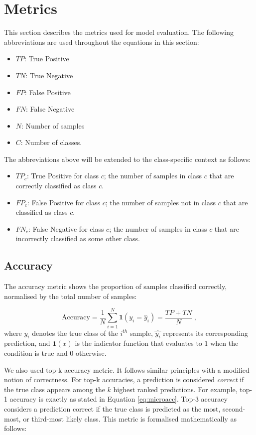\documentclass{l4proj}
\begin{document}
\section{Metrics} \label{sec:metrics}
This section describes the metrics used for model evaluation. The following abbreviations are used throughout the equations in this section:
\begin{itemize}
    \item $TP$: True Positive
    \item $TN$: True Negative
    \item $FP$: False Positive
    \item $FN$: False Negative
    \item $N$: Number of samples
    \item $C$: Number of classes.
\end{itemize}

The abbreviations above will be extended to the class-specific context as follows:
\begin{itemize}
    \item $TP_c$: True Positive for class $c$; the number of samples in class $c$ that are correctly classified as class $c$.
    \item $FP_c$: False Positive for class $c$; the number of samples not in class $c$ that are classified as class $c$.
    \item $FN_c$: False Negative for class $c$; the number of samples in class $c$ that are incorrectly classified as some other class.
\end{itemize}



\subsection{Accuracy} \label{sec:accuracy-metric}
The accuracy metric shows the proportion of samples classified correctly, normalised by the total number of samples:

\begin{equation} \label{eq:microacc}
    \text{Accuracy} = \frac{1}{N} \sum_{i=1}^{N}\boldsymbol{1}(y_i = \hat{y}_i) =  \frac{TP+TN}{N}\ ,
\end{equation}
where $y_i$ denotes the true class of the $i^{th}$ sample, $\hat{y_i}$ represents its corresponding prediction, and $\boldsymbol{1}(x)$ is the indicator function that evaluates to $1$ when the condition is true and $0$ otherwise.

We also used top-k accuracy metric. It follows similar principles with a modified notion of correctness. For top-k accuracies, a prediction is considered \emph{correct} if the true class appears among the $k$ highest ranked predictions. For example, top-1 accuracy is exactly as stated in Equation \ref{eq:microacc}. Top-3 accuracy considers a prediction correct if the true class is predicted as the most, second-most, or third-most likely class. This metric is formalised mathematically as follows:
\end{document}
